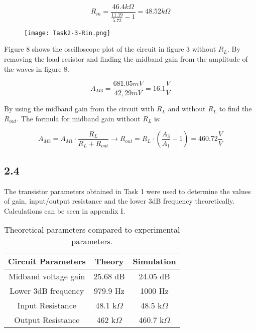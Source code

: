 	$$  R_{in} = \frac{46.4 k \Omega }{\frac{11.19}{5.72}-1} = 48.52 k \Omega$$ 

\pagebreak

	\begin{figure}[h!]
        \centering
        \texttt{[image: Task2-3-Rin.png]}
    \end{figure}

	Figure 8 shows the oscilloscope plot of the circuit in figure 3 without $R_{L}$. By removing the load resistor and finding the midband gain from the amplitude of the waves in figure 8.


	$$ A_{M3} = \frac{681.05 mV}{42,29 mV} = 16.1 \frac{V}{V} $$

	By using the midband gain from the circuit with $R_{L}$ and without $R_{L}$ to find the $R_{out}$. The formula for midband gain without $R_{L}$ is:


	$$ A_{M3} = A_{M1} \cdot \frac{R_{L}}{R_{L} + R_{out}} \rightarrow R_{out} = R_{L} \cdot (\frac{A_{3}}{A_{1}}-1) = 460.72 \frac{V}{V}$$

\pagebreak




\subsection*{2.4}

The transistor parameters obtained in Task 1 were used to determine the values of gain, input/output resistance and the lower 3dB frequency theoretically. Calculations can be seen in appendix I.\\

\begin{table}[htbp]
    \centering
        \begin{tabular}{ c | c | c }
        \hline
        Circuit Parameters     &   Theory                  & Simulation \\
        \hline
        Midband voltage gain    &   25.68 dB			    &   24.05 dB\\
        Lower 3dB frequency     &   979.9 Hz                &   1000 Hz\\
        Input Resistance        &   48.1 k$\Omega$           &   48.5 k$\Omega$\\
        Output Resistance       &   462 k$\Omega$            &   460.7 k$\Omega$\\
        \end{tabular}%
    \caption{Theoretical parameters compared to experimental parameters.}
    \label{tab:addlabel}%
\end{table}%

